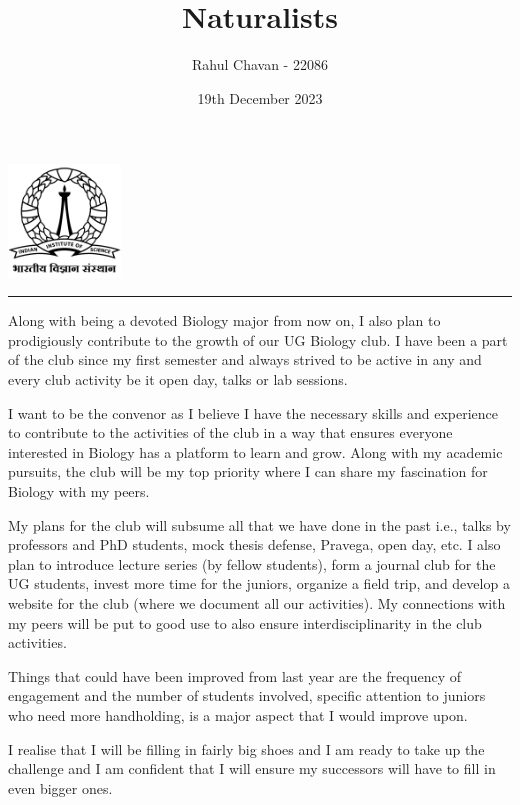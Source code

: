 \documentclass[12pt]{report}
\title{\textbf{Naturalists}}
\author{Rahul Chavan - 22086}
\date{19th December 2023}
\renewcommand{\maketitle}{
 \begin{center}
    \includegraphics[width=3cm]{IISc_Master_Seal_Black.jpg}
    \vspace{0.5cm}

    \Large
    \textbf{\thetitle}
    
    \vspace{0.5cm}
    
    \Large
    \theauthor
    
    \vspace{0.2cm}
    
    \large
    \thedate

    \vspace{0.5cm}

    \hrule  
    
  \end{center}
}
\begin{document}
\maketitle


 

Along with being a devoted Biology major from now on, I also plan to prodigiously contribute to the growth of our UG Biology club.
I have been a part of the club since my first semester and always strived to be active in any and every club activity be it open day, 
talks or lab sessions. 

I want to be the convenor as I believe I have the necessary skills and experience to contribute to the activities of the club 
in a way that ensures everyone interested in Biology has a platform to learn and grow. Along with my academic pursuits, 
the club will be my top priority where I can share my fascination for Biology with my peers.

My plans for the club will subsume all that we have done in the past i.e., talks by professors and PhD students,
mock thesis defense, Pravega, open day, etc. I also plan to introduce lecture series (by fellow students),
form a journal club for the UG students, invest more time for the juniors, organize a field trip,
and develop a website for the club (where we document all our activities). My connections with my peers will be
put to good use to also ensure interdisciplinarity in the club activities.

Things that could have been improved from last year are the frequency of engagement and the number of students involved, specific
attention to juniors who need more handholding, is a major aspect that I would improve upon. 

I realise that I will be filling in fairly big shoes and I am ready to take up the challenge and 
I am confident that I will ensure my successors will have to fill in even bigger ones.
\end{document}

